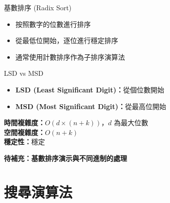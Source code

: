 \documentclass{beamer}
\begin{document}
\begin{frame}{基數排序 (Radix Sort)}
\begin{itemize}
    \item 按照數字的位數進行排序
    \item 從最低位開始，逐位進行穩定排序
    \item 通常使用計數排序作為子排序演算法
\end{itemize}

\vspace{1em}
\begin{block}{LSD vs MSD}
\begin{itemize}
    \item \textbf{LSD (Least Significant Digit)：}從個位數開始
    \item \textbf{MSD (Most Significant Digit)：}從最高位開始
\end{itemize}
\end{block}

\vspace{1em}
\textbf{時間複雜度：}$O(d \times (n+k))$，$d$ 為最大位數\\
\textbf{空間複雜度：}$O(n+k)$\\
\textbf{穩定性：}穩定

\vspace{1em}
\textbf{待補充：基數排序演示與不同進制的處理}
\end{frame}

\section{搜尋演算法}
\end{document}
